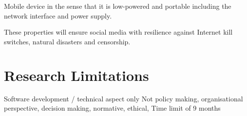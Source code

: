 Mobile device in the sense that it is low-powered and portable including the network interface and power supply.

These properties will ensure social media with resilience against Internet kill switches, natural disasters and censorship.



\section{Research Limitations} %
Software development / technical aspect only
Not policy making, organisational perspective, decision making, normative, ethical,
Time limit of 9 months













